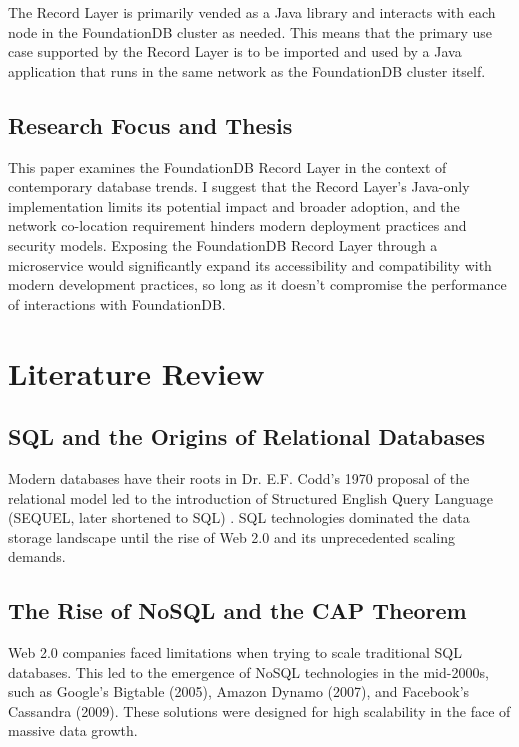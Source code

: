 \documentclass[sigconf]{acmart}
\begin{document}
The Record Layer is primarily vended as a Java library and interacts with each node in the FoundationDB cluster as needed. This means that the primary use case supported by the Record Layer is to be imported and used by a Java application that runs in the same network as the FoundationDB cluster itself.

\subsection{Research Focus and Thesis}
This paper examines the FoundationDB Record Layer in the context of contemporary database trends. I suggest that the Record Layer's Java-only implementation limits its potential impact and broader adoption, and the network co-location requirement hinders modern deployment practices and security models. Exposing the FoundationDB Record Layer through a microservice would significantly expand its accessibility and compatibility with modern development practices, so long as it doesn't compromise the performance of interactions with FoundationDB.

\section{Literature Review}

\subsection{SQL and the Origins of Relational Databases}

Modern databases have their roots in Dr. E.F. Codd's 1970 proposal of the relational model \cite{CoddTheory}  led to the introduction of Structured English Query Language (SEQUEL, later shortened to SQL) \cite{SEQUEL}. SQL technologies dominated the data storage landscape until the rise of Web 2.0 and its unprecedented scaling demands.

\subsection{The Rise of NoSQL and the CAP Theorem}

Web 2.0 companies faced limitations when trying to scale traditional SQL databases. This led to the emergence of NoSQL technologies in the mid-2000s, such as Google's Bigtable (2005)\cite{BigTable}, Amazon Dynamo (2007)\cite{Dynamo}, and Facebook's Cassandra (2009)\cite{Cassandra}. These solutions were designed for high scalability in the face of massive data growth.
\end{document}
